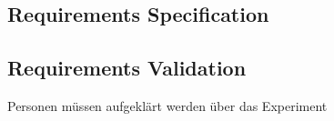 \subsection{Requirements Specification}

\subsection{Requirements Validation}


Personen müssen aufgeklärt werden über das Experiment \cite{Dresch.2011}








